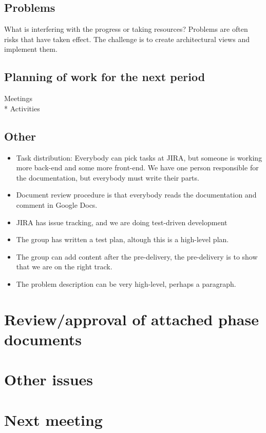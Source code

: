 \documentclass[a4paper,12pt]{article}
\begin{document}
\subsection{Problems}
What is interfering with the progress or taking resources? Problems are often risks that have taken effect.
\newline
The challenge is to create architectural views and implement them.
\subsection{Planning of work for the next period}
Meetings\\*
Activities
\subsection{Other}
\begin{itemize}
\item
Task distribution: Everybody can pick tasks at JIRA, but someone is working more back-end and some more front-end. We
have one person responsible for the documentation, but everybody must write their parts.
\item
Document review procedure is that everybody reads the documentation and comment in 
Google Docs. 
\item
JIRA has issue tracking, and we are doing test-driven development
\item
The group has written a test plan, altough this is a high-level plan.
\item
The group can add content after the pre-delivery, the pre-delivery 
is to show that we are on the right track.
\item
The problem description can be very high-level, perhaps a paragraph.
\end{itemize}
\section{Review/approval of attached phase documents}
\section{Other issues}
\section{Next meeting}
\end{document}
